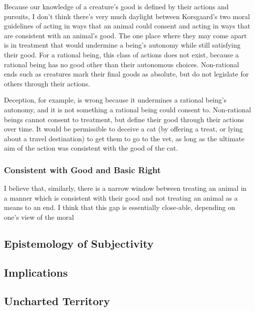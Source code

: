 			Because our knowledge of a creature’s good is defined by their
			actions and pursuits, I don’t think there’s very much daylight
			between Korsgaard’s two moral guidelines of acting in ways that an
			animal could consent and acting in ways that are consistent with an
			animal’s good.  The one place where they may come apart is in
			treatment that would undermine a being’s autonomy while still
			satisfying their good.  For a rational being, this class of actions
			does not exist, because a rational being has no good other than
			their autonomous choices.  Non-rational ends such as creatures mark
			their final goods as absolute, but do not legislate for others
			through their actions.

			Deception, for example, is wrong because it undermines a rational
			being’s autonomy, and it is not something a rational being could
			consent to. Non-rational beings cannot consent to treatment, but
			define their good through their actions over time. It would be
			permissible to deceive a cat (by offering a treat, or lying about a
			travel destination) to get them to go to the vet, as long as the
			ultimate aim of the action was consistent with the good of the cat.

		\subsubsection{Consistent with Good and Basic Right}
			
			I believe that, similarly, there is a narrow window between
			treating an animal in a manner which is consistent with their good
			and not treating an animal as a means to an end.  I think that this
			gap is essentially close-able, depending on one’s view of the moral

	\subsection{Epistemology of Subjectivity}
	\subsection{Implications}
	\subsection{Uncharted Territory}
